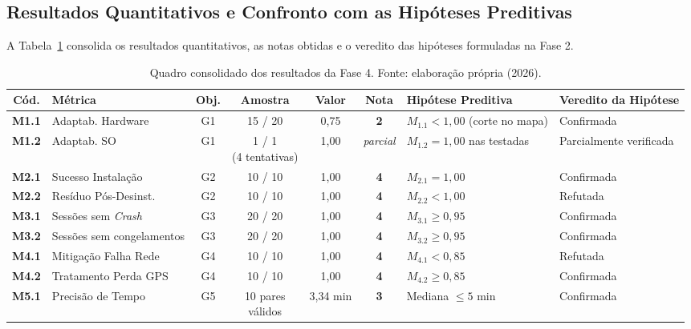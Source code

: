 \documentclass[11pt,a4paper]{article}
\begin{document}
\noindent\begin{minipage}{\textwidth}
\subsection{Resultados Quantitativos e Confronto com as Hipóteses Preditivas}
\label{sec:resultados_metricas}

A Tabela~\ref{tab:resultados_consolidados} consolida os resultados quantitativos, as notas obtidas e o veredito das hipóteses formuladas na Fase 2.

\begin{table}[H]
\centering
\caption{Quadro consolidado dos resultados da Fase 4. Fonte: elaboração própria (2026).}
\label{tab:resultados_consolidados}
\scriptsize
\renewcommand{\arraystretch}{0.92}
\begin{tabularx}{\textwidth}{c >{\raggedright\arraybackslash}p{2.4cm} c c c c X >{\raggedright\arraybackslash}p{2.5cm}}
\toprule
\textbf{Cód.} & \textbf{Métrica} & \textbf{Obj.} & \textbf{Amostra} & \textbf{Valor} & \textbf{Nota} & \textbf{Hipótese Preditiva} & \textbf{Veredito da Hipótese} \\
\midrule
\textbf{M1.1} & Adaptab. Hardware & G1 & 15 / 20 & 0,75 & \textbf{2} & $M_{1.1} < 1{,}00$ (corte no mapa) & Confirmada \\
\textbf{M1.2} & Adaptab. SO & G1 & \shortstack{1 / 1\\(4 tentativas)} & 1,00 & \textit{parcial} & $M_{1.2} = 1{,}00$ nas testadas & Parcialmente verificada \\
\textbf{M2.1} & Sucesso Instalação & G2 & 10 / 10 & 1,00 & \textbf{4} & $M_{2.1} = 1{,}00$ & Confirmada \\
\textbf{M2.2} & Resíduo Pós-Desinst. & G2 & 10 / 10 & 1,00 & \textbf{4} & $M_{2.2} < 1{,}00$ & Refutada \\
\textbf{M3.1} & Sessões sem \textit{Crash} & G3 & 20 / 20 & 1,00 & \textbf{4} & $M_{3.1} \ge 0{,}95$ & Confirmada \\
\textbf{M3.2} & Sessões sem congelamentos & G3 & 20 / 20 & 1,00 & \textbf{4} & $M_{3.2} \ge 0{,}95$ & Confirmada \\
\textbf{M4.1} & Mitigação Falha Rede & G4 & 10 / 10 & 1,00 & \textbf{4} & $M_{4.1} < 0{,}85$ & Refutada \\
\textbf{M4.2} & Tratamento Perda GPS & G4 & 10 / 10 & 1,00 & \textbf{4} & $M_{4.2} \ge 0{,}85$ & Confirmada \\
\textbf{M5.1} & Precisão de Tempo & G5 & \shortstack{10 pares\\válidos} & 3,34 min & \textbf{3} & Mediana $\le 5$ min & Confirmada \\

\end{tabularx}
\end{table}
\end{minipage}
\end{document}
